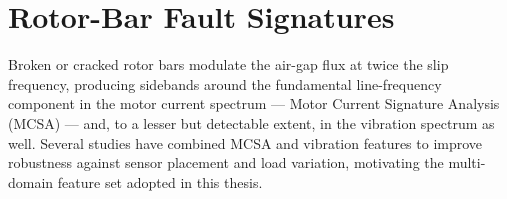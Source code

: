 \section{Rotor-Bar Fault Signatures}
Broken or cracked rotor bars modulate the air-gap flux at twice the slip frequency, producing
sidebands around the fundamental line-frequency component in the motor current spectrum ---
Motor Current Signature Analysis (MCSA) --- and, to a lesser but detectable extent, in the
vibration spectrum as well. Several studies have combined MCSA and vibration features to improve
robustness against sensor placement and load variation, motivating the multi-domain feature set
adopted in this thesis.
